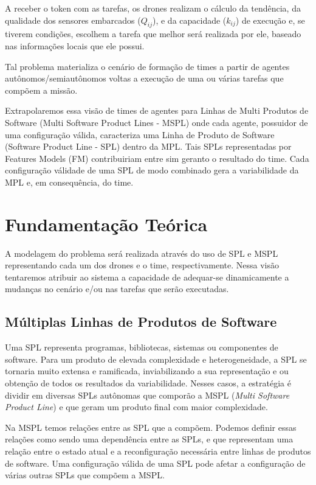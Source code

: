 \documentclass[12pt,oneside, a4paper]{article}
\begin{document}
A receber o token com as tarefas, os drones realizam o cálculo da tendência, da qualidade dos sensores embarcados ($Q_{ij}$), e da capacidade ($k_{ij}$) de execução e, se tiverem condições, escolhem a tarefa que melhor será realizada por ele, baseado nas informações locais que ele possui.

Tal problema materializa o cenário de formação de times a partir de agentes autônomos/semiautônomos \cite{04} voltas a execução de uma ou várias tarefas que compõem a missão. 

Extrapolaremos essa visão de times de agentes para Linhas de Multi Produtos de Software (Multi Software Product Lines - MSPL) onde cada agente, possuidor de uma configuração válida, caracteriza uma Linha de Produto de Software (Software Product Line - SPL) dentro da MPL. Tais SPLs representadas por Features Models (FM) contribuiriam entre sim geranto o resultado do time. Cada configuração válidade de uma SPL de modo combinado gera a variabilidade da MPL e, em consequência, do time.



\section{Fundamentação Teórica}
A modelagem do problema será realizada através do uso de SPL e MSPL representando cada um dos drones e o time, respectivamente. Nessa visão tentaremos atribuir ao sistema a capacidade de adequar-se dinamicamente a mudanças no cenário e/ou nas tarefas que serão executadas.


\subsection{Múltiplas Linhas de Produtos de Software}

Uma SPL representa programas, bibliotecas, sistemas ou componentes de software. Para um produto de elevada complexidade e heterogeneidade, a SPL se tornaria muito extensa e ramificada, inviabilizando a sua representação e ou obtenção de todos os resultados da variabilidade. Nesses casos, a estratégia é dividir em diversas SPLs autônomas que comporão a MSPL (\textit{Multi Software Product Line}) e que geram um produto final com maior complexidade.

Na MSPL temos relações entre as SPL que a compõem. Podemos definir essas relações como sendo uma dependência entre as SPLs, e que representam uma relação entre o estado atual e a reconfiguração necessária entre linhas de produtos de software. Uma configuração válida de uma SPL pode afetar a configuração de várias outras SPLs que compõem a MSPL\cite{05}.
\end{document}
